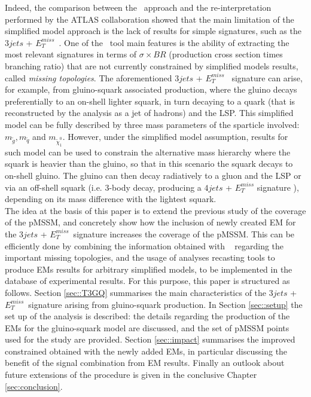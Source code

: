 \documentclass[epj,nopacs,fleqn]{svjour}
\newcommand{\MET}{{ $E_T ^{miss}$}}
\begin{document}
Indeed, the comparison between the \SMO~approach and the re-interpretation performed by the ATLAS collaboration showed  that the main limitation of the simplified model approach is the lack of results for simple signatures, such as the $3jets$ +\MET~. One of the \SMO~tool main features is the ability of extracting the most relevant signatures in terms of $\sigma \times BR$ (production cross section  times branching ratio) that are not currently constrained by simplified models results, called \textit{missing topologies}. The aforementioned $3jets$ +\MET~ signature can arise, for example, from gluino-squark associated production, where the gluino decays preferentially to an on-shell lighter squark, in turn decaying to a quark (that is reconstructed by the analysis as a jet of hadrons) and the LSP. This simplified model can be fully described by three mass parameters of the sparticle involved: $m_{\tilde g}, m_{\tilde q}$ and $m_{\tilde \chi _1 ^0}$. However, under the simplified model assumption, results for such model can be used to constrain the alternative mass hierarchy where the squark is heavier than the gluino, so that in this scenario the squark decays to on-shell gluino. The gluino can then decay radiatively to a gluon and the LSP or via an off-shell squark (i.e. 3-body decay, producing a $4jets$ + $E_T ^{miss}$ signature ), depending on its mass difference with the lightest squark. 
\\

The idea at the basis of this paper is to extend the previous study of the coverage of the pMSSM, and concretely show how the inclusion of newly created EM for the $3jets$ + \MET~signature increases the coverage of the pMSSM. This can be efficiently done by combining the information obtained with \SMO~ regarding the important missing topologies, and the usage of analyses recasting tools to produce EMs results for arbitrary simplified models, to be implemented in the database of experimental results. For this purpose, this paper is structured as follows. Section \ref{sec::T3GQ} summarises the main characteristics of the $3jets$ + \MET~signature arising from gluino-squark production. In Section \ref{sec::setup} the set up of the \SMO analysis is described: the details regarding the production of the EMs for the gluino-squark model are discussed, and the set of pMSSM points used for the study are provided. Section \ref{sec::impact} summarises the improved constrained obtained with the newly added EMs, in particular discussing the benefit of the signal combination from EM results. Finally an outlook about future extensions of the procedure is given in the conclusive Chapter \ref{sec:conclusion}.  
\end{document}
